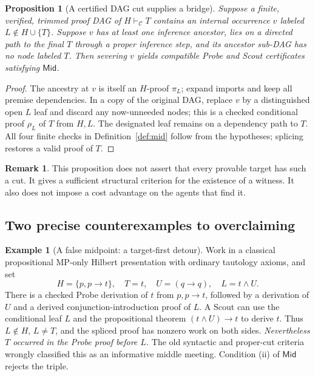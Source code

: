 \documentclass[11pt,letterpaper]{article}
\newtheorem{proposition}[theorem]{Proposition}
\theoremstyle{definition}
\newtheorem{example}[theorem]{Example}
\newtheorem{remark}[theorem]{Remark}
\newcommand{\vdC}{\vdash_{\mathcal C}}
\newcommand{\Mid}{\mathsf{Mid}}
\begin{document}
\begin{proposition}[A certified DAG cut supplies a bridge]\label{prop:cut}
Suppose a finite, verified, trimmed proof DAG of $H\vdC T$ contains an
internal occurrence $v$ labeled $L\notin H\cup\{T\}$. Suppose $v$ has
at least one inference ancestor, lies on a directed path to the final
$T$ through a proper inference step, and its ancestor sub-DAG has no
node labeled $T$. Then severing $v$ yields compatible Probe and Scout
certificates satisfying $\Mid$.
\end{proposition}
\begin{proof}
The ancestry at $v$ is itself an $H$-proof $\pi_L$; expand imports
and keep all premise dependencies. In a copy of the original DAG,
replace $v$ by a distinguished open $L$ leaf and discard any now-unneeded
nodes; this is a checked conditional proof $\rho_L$ of $T$ from $H,L$.
The designated leaf remains on a dependency path to $T$. All four
finite checks in Definition~\ref{def:mid} follow from the hypotheses;
splicing restores a valid proof of $T$.
\end{proof}

\begin{remark}
This proposition does not assert that every provable target has such a
cut. It gives a sufficient structural criterion for the existence of a
witness. It also does not impose a cost advantage on the agents that find it.
\end{remark}

\subsection{Two precise counterexamples to overclaiming}
\begin{example}[A false midpoint: a target-first detour]\label{ex:detour}
Work in a classical propositional MP-only Hilbert presentation with
ordinary tautology axioms, and set
\[
 H=\{p,p\to t\},\quad T=t,\quad U=(q\to q),\quad L=t\land U.
\]
There is a checked Probe derivation of $t$ from $p,p\to t$, followed by
a derivation of $U$ and a derived conjunction-introduction proof of
$L$. A Scout can use the conditional leaf $L$ and the propositional
theorem $(t\land U)\to t$ to derive $t$. Thus $L\notin H$, $L\neq T$,
and the spliced proof has nonzero work on both sides. \emph{Nevertheless
$T$ occurred in the Probe proof before $L$.} The old syntactic and
proper-cut criteria wrongly classified this as an informative middle
meeting. Condition (ii) of $\Mid$ rejects the triple.
\end{example}
\end{document}
